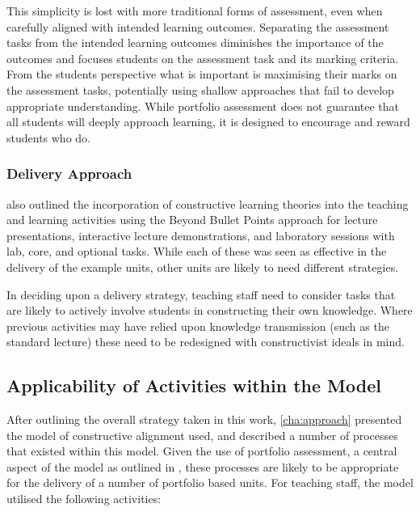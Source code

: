 This simplicity is lost with more traditional forms of assessment, even when carefully aligned with intended learning outcomes. Separating the assessment tasks from the intended learning outcomes diminishes the importance of the outcomes and focuses students on the assessment task and its marking criteria. From the students perspective what is important is maximising their marks on the assessment tasks, potentially using shallow approaches that fail to develop appropriate understanding. While portfolio assessment does not guarantee that all students will deeply approach learning, it is designed to encourage and reward students who do.


\subsubsection{Delivery Approach} %
\label{ssub:delivery_approach}

 also outlined the incorporation of constructive learning theories into the teaching and learning activities using the Beyond Bullet Points approach for lecture presentations, interactive lecture demonstrations, and laboratory sessions with lab, core, and  optional tasks. While each of these was seen as effective in the delivery of the example units, other units are likely to need different strategies. 

In deciding upon a delivery strategy, teaching staff need to consider tasks that are likely to actively involve students in constructing their own knowledge. Where previous activities may have relied upon knowledge transmission (such as the standard lecture) these need to be redesigned with constructivist ideals in mind.



\subsection{Applicability of Activities within the Model} %
\label{sub:processes_within_the_model}

After outlining the overall strategy taken in this work, \cref{cha:approach} presented the model of constructive alignment used, and described a number of processes that existed within this model. Given the use of portfolio assessment, a central aspect of the model as outlined in , these processes are likely to be appropriate for the delivery of a number of portfolio based units. For teaching staff, the model utilised the following activities:

